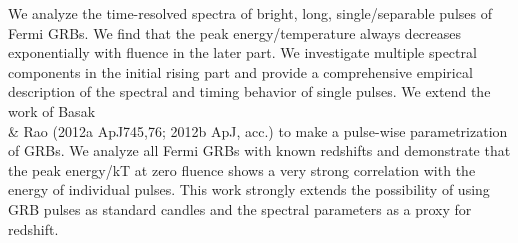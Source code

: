 


\bigskip



\bigskip

\noindent We analyze the time-resolved spectra of bright, long, single/separable pulses of Fermi GRBs. We find that the peak energy/temperature always decreases exponentially with fluence in the later part. We investigate multiple spectral components in the initial rising part and provide a comprehensive empirical description of the spectral and timing behavior of single pulses. We extend the work of Basak \\& Rao (2012a ApJ745,76; 2012b ApJ, acc.) to make a pulse-wise parametrization of GRBs. We analyze all Fermi GRBs with known redshifts and demonstrate that the peak energy/kT at zero fluence shows a very strong correlation with the energy of  individual pulses. This work strongly extends the possibility of using GRB pulses as standard candles and the spectral parameters as a proxy for redshift.

